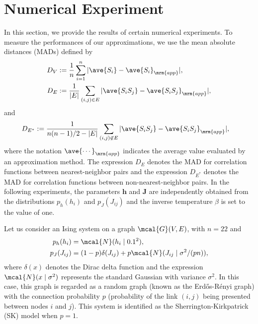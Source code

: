 \documentclass[%
 reprint,
 amsmath,amssymb,
 aps, 
 pre,
 showkeys
]{revtex4-1}
\begin{document}
\section{Numerical Experiment} \label{Sec:NumExp}

In this section, we provide the results of certain numerical experiments. 
To measure the performances of our approximations, we use the mean absolute distances (MADs) defined by
\begin{align}
D_{V}&:= \frac{1}{n} \sum_{i =1}^n| \ave{S_i} - \ave{S_i}_{\mrm{app}}|, \\
D_{E}&:= \frac{1}{|E|} \sum_{(i,j) \in E}| \ave{S_iS_j} - \ave{S_iS_j}_{\mrm{app}}|,
\end{align}
and 
\begin{align}
D_{E^*}&:= \frac{1}{n(n-1)/2 - |E|} \sum_{(i,j) \not \in E}| \ave{S_iS_j} - \ave{S_iS_j}_{\mrm{app}}|,
\end{align}
where the notation $\ave{\cdots}_{\mrm{app}}$ indicates the average value evaluated by an approximation method.
The expression $D_{E}$ denotes the MAD for correlation functions between nearest-neighbor pairs 
and the expression $D_{E^*}$ denotes the MAD for correlation functions between non-nearest-neighbor pairs. 
In the following experiments, the parameters $\bm{h}$ and $\bm{J}$ are independently obtained from the distributions $p_h(h_i)$ and $p_J(J_{ij})$
and the inverse temperature $\beta$ is set to the value of one.  



Let us consider an Ising system on a graph $\mcal{G}(V,E)$, with $n = 22$ and 
\begin{align}
p_h(h_i)&=\mcal{N}(h_i \mid 0.1^2), \\
p_J(J_{ij})&= (1-p)\delta( J_{ij}) + p\mcal{N}(J_{ij} \mid \sigma^2 / (pn) ),
\end{align}
where $\delta(x)$ denotes the Dirac delta function and the expression $\mcal{N}(x \mid \sigma^2)$ represents the standard Gaussian with variance $\sigma^2$. 
In this case, this graph is regarded as a random graph (known as the Erd{\H o}s-R{\'e}nyi graph) with the connection probability $p$ 
(probability of the link $(i,j)$ being presented between nodes $i$ and $j$). 
This system is identified as the Sherrington-Kirkpatrick (SK) model when $p=1$.
\end{document}
